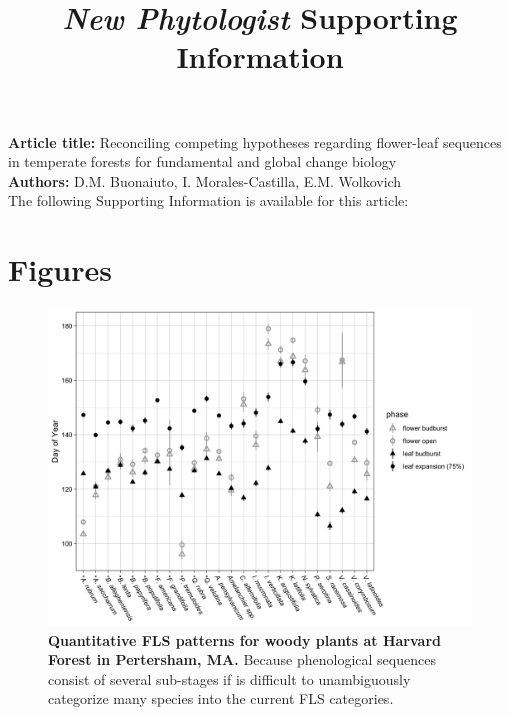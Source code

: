 \documentclass[11pt]{article}\usepackage[]{graphicx}\usepackage[]{color}
\title{\textit{New Phytologist} Supporting Information}
\date{}
\begin{document}
\maketitle

\noindent \textbf{Article title:} Reconciling competing hypotheses regarding flower-leaf sequences in temperate forests for fundamental and global change biology\\
\noindent \textbf{Authors:} D.M. Buonaiuto, I. Morales-Castilla, E.M. Wolkovich\\

\noindent The following Supporting Information is available for this article:\\

\pagebreak[4]

\section*{Figures}


\begin{figure}[H]
    \centering
 \includegraphics[width=\textwidth]{..//..//HarvardForest/HFmeans_expanded.jpeg} 
    \caption{\textbf{Quantitative FLS patterns for woody plants at Harvard Forest in Pertersham, MA.} Because phenological sequences consist of several sub-stages if is difficult to unambiguously categorize many species into the current FLS categories. }
    \label{fig:HFmeans}
\end{figure}
\end{document}

